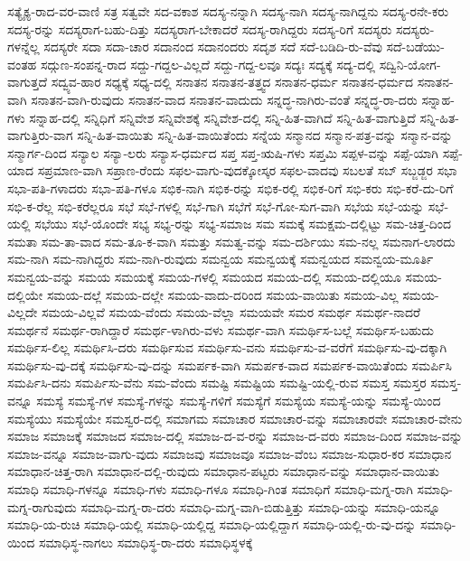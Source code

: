 {ಸತ್ಯೈಕ್ಯ-ರಾದ-ವರ-ವಾಣಿ
ಸತ್ರ
ಸತ್ವವೇ
ಸದ-ವಕಾಶ
ಸದಸ್ಯ-ನನ್ನಾಗಿ
ಸದಸ್ಯ-ನಾಗಿ
ಸದಸ್ಯ-ನಾಗಿದ್ದನು
ಸದಸ್ಯ-ರನೇ-ಕರು
ಸದಸ್ಯ-ರನ್ನು
ಸದಸ್ಯರಾಗ-ಬಹು-ದಿತ್ತು
ಸದಸ್ಯರಾಗ-ಬೇಕಾದರೆ
ಸದಸ್ಯ-ರಾಗಿದ್ದರು
ಸದಸ್ಯ-ರಿಗೆ
ಸದಸ್ಯರು
ಸದಸ್ಯರು-ಗಳನ್ನೆಲ್ಲ
ಸದಸ್ಯರೇ
ಸದಾ
ಸದಾ-ಚಾರ
ಸದಾನಂದ
ಸದಾನಂದರು
ಸದೃಶ
ಸದೆ
ಸದೆ-ಬಡಿದಿ-ರು-ವೆವು
ಸದೆ-ಬಡೆಯು-ವಂತಹ
ಸದ್ಗುಣ-ಸಂಪನ್ನ-ರಾದ
ಸದ್ದು-ಗದ್ದಲ-ವಿಲ್ಲದೆ
ಸದ್ದು-ಗದ್ದ-ಲವೂ
ಸದ್ಯಃ
ಸದ್ಯಕ್ಕೆ
ಸದ್ಯ-ದಲ್ಲಿ
ಸದ್ವಿನಿ-ಯೋಗ-ವಾಗುತ್ತದೆ
ಸದ್ವ್ಯವ-ಹಾರ
ಸಧ್ಯಕ್ಕೆ
ಸಧ್ಯ-ದಲ್ಲಿ
ಸನಾತನ
ಸನಾತನ-ತತ್ತ್ವದ
ಸನಾತನ-ಧರ್ಮ
ಸನಾತನ-ಧರ್ಮದ
ಸನಾತನ-ವಾಗಿ
ಸನಾತನ-ವಾಗಿ-ರುವುದು
ಸನಾತನ-ವಾದ
ಸನಾತನ-ವಾದುದು
ಸನ್ನದ್ಧ-ನಾಗಿರು-ವಂತೆ
ಸನ್ನದ್ಧ-ರಾ-ದರು
ಸನ್ನಾಹ-ಗಳು
ಸನ್ನಾಹ-ದಲ್ಲಿ
ಸನ್ನಿಧಿಗೆ
ಸನ್ನಿವೇಶ
ಸನ್ನಿವೇಶಕ್ಕೆ
ಸನ್ನಿವೇಶ-ದಲ್ಲಿ
ಸನ್ನಿ-ಹಿತ-ವಾಗಿದೆ
ಸನ್ನಿ-ಹಿತ-ವಾಗುತ್ತಿದೆ
ಸನ್ನಿ-ಹಿತ-ವಾಗುತ್ತಿರು-ವಾಗ
ಸನ್ನಿ-ಹಿತ-ವಾಯಿತು
ಸನ್ನಿ-ಹಿತ-ವಾಯಿತೆಂದು
ಸನ್ನೆಯ
ಸನ್ಮಾನದ
ಸನ್ಮಾನ-ಪತ್ರ-ವನ್ನು
ಸನ್ಮಾನ-ವನ್ನು
ಸನ್ಮಾರ್ಗ-ದಿಂದ
ಸನ್ಯಾಲ
ಸನ್ಯಾ-ಲರು
ಸನ್ಯಾಸ-ಧರ್ಮದ
ಸಪ್ತ
ಸಪ್ತ-ಋಷಿ-ಗಳು
ಸಪ್ತಮಿ
ಸಪ್ಪಳ-ವನ್ನು
ಸಪ್ಪೆ-ಯಾಗಿ
ಸಪ್ಪೆ-ಯಾದ
ಸಪ್ರಮಾಣ-ವಾಗಿ
ಸಪ್ರಾಣ-ರೆಂದು
ಸಫಲ-ವಾಗು-ವುದಕ್ಕೋಸ್ಕರ
ಸಫಲ-ವಾದವು
ಸಬಲತೆ
ಸಬ್
ಸಬ್ಜಡ್ಜರ
ಸಭಾ
ಸಭಾ-ಪತಿ-ಗಳಾದರು
ಸಭಾ-ಪತಿ-ಗಳೂ
ಸಭಿಕ-ನಾಗಿ
ಸಭಿಕ-ರನ್ನು
ಸಭಿಕ-ರಲ್ಲಿ
ಸಭಿಕ-ರಿಗೆ
ಸಭಿ-ಕರು
ಸಭಿ-ಕರೆ-ದು-ರಿಗೆ
ಸಭಿ-ಕ-ರೆಲ್ಲ
ಸಭಿ-ಕರೆಲ್ಲರೂ
ಸಭೆ
ಸಭೆ-ಗಳಲ್ಲಿ
ಸಭೆ-ಗಾಗಿ
ಸಭೆಗೆ
ಸಭೆ-ಗೋ-ಸುಗ-ವಾಗಿ
ಸಭೆಯ
ಸಭೆ-ಯನ್ನು
ಸಭೆ-ಯಲ್ಲಿ
ಸಭೆಯು
ಸಭೆ-ಯೊಂದೇ
ಸಭ್ಯ
ಸಭ್ಯ-ರನ್ನು
ಸಭ್ಯ-ಸಮಾಜ
ಸಮ
ಸಮಕ್ಕೆ
ಸಮಕ್ಷಮ-ದಲ್ಲಿಟ್ಟು
ಸಮ-ಚಿತ್ತ-ದಿಂದ
ಸಮತಾ
ಸಮ-ತಾ-ವಾದ
ಸಮ-ತೂ-ಕ-ವಾಗಿ
ಸಮತ್ತು
ಸಮತ್ವ-ವನ್ನು
ಸಮ-ದರ್ಶಿಯು
ಸಮ-ನಲ್ಲ
ಸಮನಾಗ-ಲಾರದು
ಸಮ-ನಾಗಿ
ಸಮ-ನಾಗಿದ್ದರು
ಸಮ-ನಾಗಿ-ರುವುದು
ಸಮನ್ವಯ
ಸಮನ್ವಯಕ್ಕೆ
ಸಮನ್ವಯದ
ಸಮನ್ವಯ-ಮೂರ್ತಿ
ಸಮನ್ವಯ-ವನ್ನು
ಸಮಯ
ಸಮಯಕ್ಕೆ
ಸಮಯ-ಗಳಲ್ಲಿ
ಸಮಯದ
ಸಮಯ-ದಲ್ಲಿ
ಸಮಯ-ದಲ್ಲಿಯೂ
ಸಮಯ-ದಲ್ಲಿಯೇ
ಸಮಯ-ದಲ್ಲೆ
ಸಮಯ-ದಲ್ಲೇ
ಸಮಯ-ವಾದು-ದರಿಂದ
ಸಮಯ-ವಾಯಿತು
ಸಮಯ-ವಿಲ್ಲ
ಸಮಯ-ವಿಲ್ಲದೇ
ಸಮಯ-ವಿಲ್ಲವೆ
ಸಮಯ-ವೆಂದು
ಸಮಯ-ವೆಲ್ಲಾ
ಸಮಯವೇ
ಸಮರ
ಸಮರ್ಥ
ಸಮರ್ಥ-ನಾದರೆ
ಸಮರ್ಥನೆ
ಸಮರ್ಥ-ರಾಗಿದ್ದಾರೆ
ಸಮರ್ಥ-ಳಾಗಿರು-ವಳು
ಸಮರ್ಥ-ವಾಗಿ
ಸಮರ್ಥಿಸ-ಬಲ್ಲೆ
ಸಮರ್ಥಿಸ-ಬಹುದು
ಸಮರ್ಥಿಸ-ಲಿಲ್ಲ
ಸಮರ್ಥಿಸಿ-ದರು
ಸಮರ್ಥಿಸುವ
ಸಮರ್ಥಿಸು-ವನು
ಸಮರ್ಥಿಸು-ವ-ವರೆಗೆ
ಸಮರ್ಥಿಸು-ವು-ದಕ್ಕಾಗಿ
ಸಮರ್ಥಿಸು-ವು-ದಕ್ಕೆ
ಸಮರ್ಥಿಸು-ವು-ದನ್ನು
ಸಮರ್ಪಕ-ವಾಗಿ
ಸಮರ್ಪಕ-ವಾದ
ಸಮರ್ಪಕ-ವಾಯಿತೆಂದು
ಸಮರ್ಪಿಸಿ
ಸಮರ್ಪಿಸಿ-ದನು
ಸಮರ್ಪಿಸು-ವೆನು
ಸಮ-ವೆಂದು
ಸಮಷ್ಟಿ
ಸಮಷ್ಟಿಯ
ಸಮಷ್ಟಿ-ಯಲ್ಲಿ-ರುವ
ಸಮಸ್ತ
ಸಮಸ್ತರ
ಸಮಸ್ತ-ವನ್ನೂ
ಸಮಸ್ಯೆ
ಸಮಸ್ಯೆ-ಗಳ
ಸಮಸ್ಯೆ-ಗಳನ್ನು
ಸಮಸ್ಯೆ-ಗಳಿಗೆ
ಸಮಸ್ಯೆಗೆ
ಸಮಸ್ಯೆಯ
ಸಮಸ್ಯೆ-ಯನ್ನು
ಸಮಸ್ಯೆ-ಯಿಂದ
ಸಮಸ್ಯೆಯು
ಸಮಸ್ಯೆಯೇ
ಸಮಸ್ವರ-ದಲ್ಲಿ
ಸಮಾಗಮ
ಸಮಾಚಾರ
ಸಮಾಚಾರ-ವನ್ನು
ಸಮಾಚಾರವೇ
ಸಮಾಚಾರ-ವೇನು
ಸಮಾಜ
ಸಮಾಜಕ್ಕೆ
ಸಮಾಜದ
ಸಮಾಜ-ದಲ್ಲಿ
ಸಮಾಜ-ದ-ವ-ರನ್ನು
ಸಮಾಜ-ದ-ವರು
ಸಮಾಜ-ದಿಂದ
ಸಮಾಜ-ವನ್ನು
ಸಮಾಜ-ವನ್ನೂ
ಸಮಾಜ-ವಾಗು-ವುದು
ಸಮಾಜವು
ಸಮಾಜವೂ
ಸಮಾಜ-ವೆಂಬ
ಸಮಾಜ-ಸುಧಾರ-ಕರ
ಸಮಾಧಾನ
ಸಮಾಧಾನ-ಚಿತ್ತ-ರಾಗಿ
ಸಮಾಧಾನ-ದಲ್ಲಿ-ರುವುದು
ಸಮಾಧಾನ-ಪಟ್ಟರು
ಸಮಾಧಾನ-ವನ್ನು
ಸಮಾಧಾನ-ವಾಯಿತು
ಸಮಾಧಿ
ಸಮಾಧಿ-ಗಳನ್ನೂ
ಸಮಾಧಿ-ಗಳು
ಸಮಾಧಿ-ಗಳೂ
ಸಮಾಧಿ-ಗಿಂತ
ಸಮಾಧಿಗೆ
ಸಮಾಧಿ-ಮಗ್ನ-ರಾಗಿ
ಸಮಾಧಿ-ಮಗ್ನ-ರಾಗುವುದು
ಸಮಾಧಿ-ಮಗ್ನ-ರಾ-ದರು
ಸಮಾಧಿ-ಮಗ್ನ-ವಾಗಿ-ಬಿಡುತ್ತಿತ್ತು
ಸಮಾಧಿ-ಯನ್ನು
ಸಮಾಧಿ-ಯನ್ನೂ
ಸಮಾಧಿ-ಯ-ರುಚಿ
ಸಮಾಧಿ-ಯಲ್ಲಿ
ಸಮಾಧಿ-ಯಲ್ಲಿದ್ದ
ಸಮಾಧಿ-ಯಲ್ಲಿದ್ದಾಗ
ಸಮಾಧಿ-ಯಲ್ಲಿ-ರು-ವು-ದನ್ನು
ಸಮಾಧಿ-ಯಿಂದ
ಸಮಾಧಿಸ್ಥ-ನಾಗಲು
ಸಮಾಧಿಸ್ಥ-ರಾ-ದರು
ಸಮಾಧಿಸ್ಥಳಕ್ಕೆ
}
